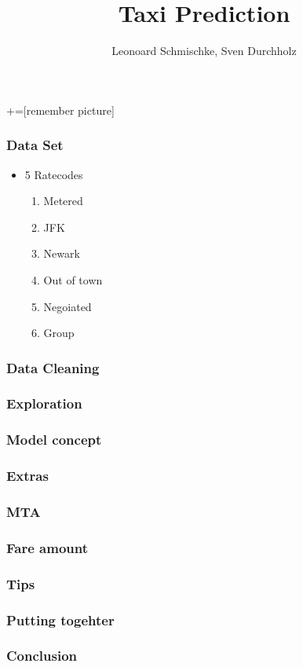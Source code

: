 \documentclass{beamer}
\author{Leonoard Schmischke, Sven Durchholz}
\title{Taxi Prediction}
\begin{document}
\frame{\titlepage}


\begin{comment}
:Title: Beamer arrows
:Tags: Remember picture, Beamer, Physics & chemistry, Overlays
:Use page: 3

With PGF/TikZ version 1.09 and later, it is possible to draw paths between nodes across
different pictures. This is a useful feature for presentations with the
Beamer package. In this example I've combined the new PGF/TikZ's overlay feature
with Beamer overlays. Download the PDF version to see the result.

**Note.** This only works with PDFTeX, and you have to run PDFTeX twice.

| Author: Kjell Magne Fauske

\end{comment}


+=[remember picture]

\everymath{\displaystyle}

\begin{frame}
\frametitle{Data Set}
\begin{itemize}
	\item 5 Ratecodes
	\begin{enumerate}
		\item Metered
		\item JFK
		\item Newark
		\item Out of town
		\item Negoiated
		\item Group
	\end{enumerate}
\end{itemize}
\end{frame}

\begin{frame}
\frametitle{Data Cleaning}
\end{frame}

\begin{frame}
\frametitle{Exploration}
\end{frame}

\begin{frame}
\frametitle{Model concept}
\end{frame}

\begin{frame}
\frametitle{Extras}
\end{frame}

\begin{frame}
\frametitle{MTA}
\end{frame}

\begin{frame}
\frametitle{Fare amount}
\end{frame}

\begin{frame}
\frametitle{Tips}
\end{frame}

\begin{frame}
\frametitle{Putting togehter}
\end{frame}

\begin{frame}
\frametitle{Conclusion}
\end{frame}
\end{document}
